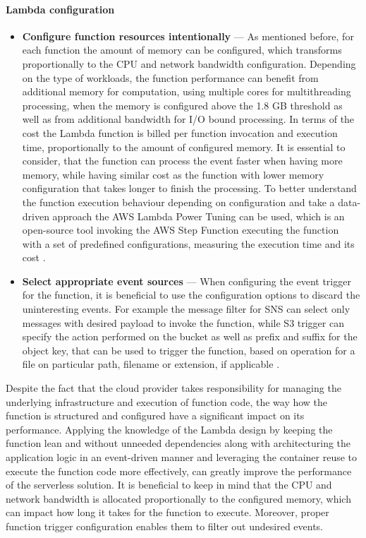 \paragraph{Lambda configuration}

\begin{itemize}
   \item \textbf{Configure function resources intentionally} --- As mentioned before, for each function the amount of memory can be configured, which transforms proportionally to the CPU and network bandwidth configuration.
   Depending on the type of workloads, the function performance can benefit from additional memory for computation, using multiple cores for multithreading processing, when the memory is configured above the 1.8 GB threshold as well as from additional bandwidth for I/O bound processing.
   In terms of the cost the Lambda function is billed per function invocation and execution time, proportionally to the amount of configured memory.
   It is essential to consider, that the function can process the event faster when having more memory, while having similar cost as the function with lower memory configuration that takes longer to finish the processing.
   To better understand the function execution behaviour depending on configuration and take a data-driven approach the AWS Lambda Power Tuning can be used, which is an open-source tool invoking the AWS Step Function executing the function with a set of predefined configurations, measuring the execution time and its cost \cite{BecomeAServerlessBlackBelt}.
   \item \textbf{Select appropriate event sources} --- When configuring the event trigger for the function, it is beneficial to use the configuration options to discard the uninteresting events. For example the message filter for SNS can select only messages with desired payload to invoke the function, while S3 trigger can specify the action performed on the bucket as well as prefix and suffix for the object key, that can be used to trigger the function, based on operation for a file on particular path, filename or extension, if applicable \cite{BecomeAServerlessBlackBelt}.
\end{itemize}

Despite the fact that the cloud provider takes responsibility for managing the underlying infrastructure and execution of function code, the way how the function is structured and configured have a significant impact on its performance.
Applying the knowledge of the Lambda design by keeping the function lean and without unneeded dependencies along with architecturing the application logic in an event-driven manner and leveraging the container reuse to execute the function code more effectively, can greatly improve the performance of the serverless solution.
It is beneficial to keep in mind that the CPU and network bandwidth is allocated proportionally to the configured memory, which can impact how long it takes for the function to execute.
Moreover, proper function trigger configuration enables them to filter out undesired events.

